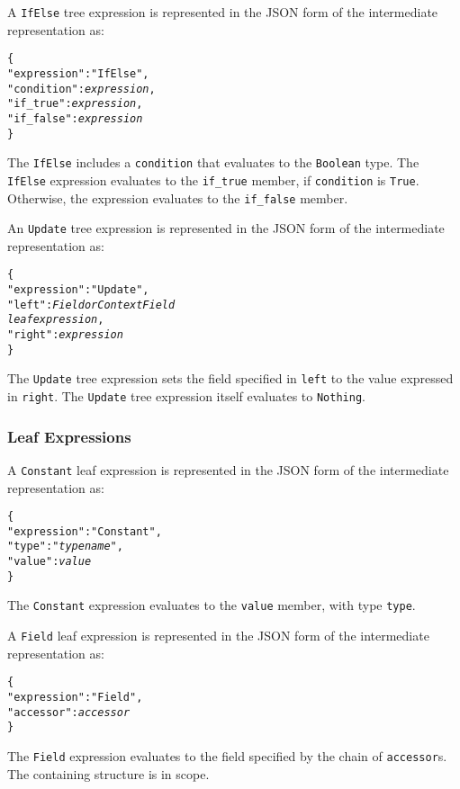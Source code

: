 \documentclass[10pt,twocolumn,a4paper]{article}
\newcommand{\code}[1]{\texttt{#1}}
\begin{document}
A \code{IfElse} tree expression is represented in the JSON form of the
intermediate representation as:
\footnotesize
\begin{alltt}
  \{
    "expression"  : "IfElse",
    "condition"   : \emph{expression},
    "if\_true"     : \emph{expression},
    "if\_false"    : \emph{expression}
  \}
\end{alltt}
\normalsize
The \code{IfElse} includes a \code{condition} that evaluates to the \code{Boolean} type.
The \code{IfElse} expression evaluates to the \code{if\_true} member, if \code{condition}
is \code{True}. Otherwise, the expression evaluates to the \code{if\_false} member.

An \code{Update} tree expression is represented in the JSON form of the
intermediate representation as:
\footnotesize
\begin{alltt}
  \{
    "expression"  : "Update",
    "left"        : \emph{Field or ContextField 
                    leaf expression},
    "right"       : \emph{expression}
  \}
\end{alltt}
\normalsize
The \code{Update} tree expression sets the field specified in \code{left} to the value
expressed in \code{right}. The \code{Update} tree expression itself evaluates to
\code{Nothing}.

\subsubsection{Leaf Expressions}

A \code{Constant} leaf expression is represented in the JSON form of the
intermediate representation as:
\footnotesize
\begin{alltt}
  \{
    "expression"   : "Constant",
    "type"         : "\emph{type name}",
    "value"        : \emph{value}
  \}
\end{alltt}
\normalsize
The \code{Constant} expression evaluates to the \code{value} member, with type \code{type}.

A \code{Field} leaf expression is represented in the JSON form of the
intermediate representation as:
\footnotesize
\begin{alltt}
  \{
    "expression"   : "Field",
    "accessor"     : \emph{accessor}
  \}
\end{alltt}
\normalsize

The \code{Field} expression evaluates to the field specified by the chain of
\code{accessor}s. The containing structure is in scope.
\end{document}
